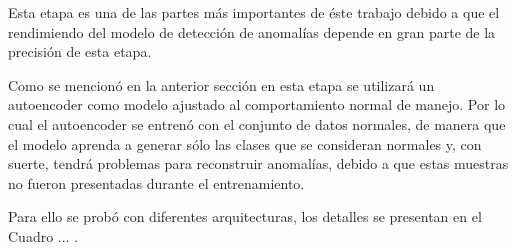 Esta etapa es una de las partes m\'{a}s importantes de \'{e}ste trabajo debido a que el rendimiendo del modelo de detecci\'{o}n de anomal\'{i}as depende en gran parte de la precisi\'{o}n de esta etapa.

\vspace{5mm} %

Como se mencion\'{o} en la anterior secci\'{o}n en esta etapa se utilizar\'{a} un autoencoder como modelo ajustado al comportamiento normal de manejo. Por lo cual el autoencoder se entren\'{o} con el conjunto de datos normales, de manera que el modelo aprenda a generar s\'{o}lo las clases que se consideran normales y, con suerte, tendr\'{a} problemas para reconstruir anomal\'{i}as, debido a que estas muestras no fueron presentadas durante el entrenamiento.

\vspace{5mm} %

Para ello se prob\'{o} con diferentes arquitecturas, los detalles se presentan en el Cuadro ... . 

